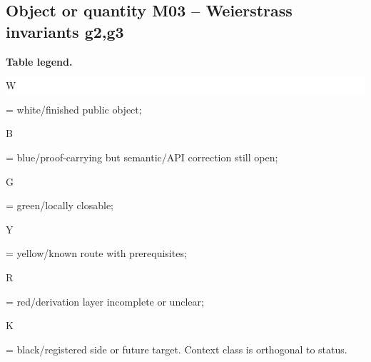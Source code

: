\subsection*{Object or quantity M03 -- Weierstrass invariants g2,g3}
\hypertarget{objproof:M03}{}
\par\smallskip\noindent\begin{minipage}{0.99\linewidth}\footnotesize\raggedright\textbf{Table legend.} \colorbox{white}{\strut W} = white/finished public object; \colorbox{cyan!20}{\strut B} = blue/proof-carrying but semantic/API correction still open; \colorbox{green!18}{\strut G} = green/locally closable; \colorbox{yellow!25}{\strut Y} = yellow/known route with prerequisites; \colorbox{red!20}{\strut R} = red/derivation layer incomplete or unclear; \colorbox{black!18}{\strut K} = black/registered side or future target. Context class is orthogonal to status.\end{minipage}\par\vspace{0.25em}
